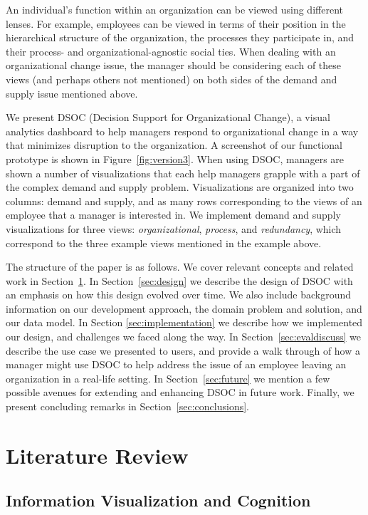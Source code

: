 \documentclass[journal]{vgtc}                %
\begin{document}
An individual's function within an organization can be viewed using different lenses. For example, employees can be viewed in terms of their position in the hierarchical structure of the organization, the processes they participate in, and their process- and organizational-agnostic social ties. When dealing with an organizational change issue, the manager should be considering each of these views (and perhaps others not mentioned) on both sides of the demand and supply issue mentioned above.

We present DSOC (Decision Support for Organizational Change), a visual analytics dashboard to help managers respond to organizational change in a way that minimizes disruption to the organization. A screenshot of our functional prototype is shown in Figure~\ref{fig:version3}. When using DSOC, managers are shown a number of visualizations that each help managers grapple with a part of the complex demand and supply problem. Visualizations are organized into two columns: demand and supply, and as many rows corresponding to the views of an employee that a manager is interested in. We implement demand and supply visualizations for three views: \emph{organizational}, \emph{process}, and \emph{redundancy}, which correspond to the three example views mentioned in the example above. 

The structure of the paper is as follows. We cover relevant concepts and related work in Section~\ref{sec:litreview}. In Section~\ref{sec:design} we describe the design of DSOC with an emphasis on how this design evolved over time. We also include background information on our development approach, the domain problem and solution, and our data model. In Section \ref{sec:implementation} we describe how we implemented our design, and challenges we faced along the way. In Section~\ref{sec:evaldiscuss} we describe the use case we presented to users, and provide a walk through of how a manager might use DSOC to help address the issue of an employee leaving an organization in a real-life setting. In Section~\ref{sec:future} we mention a few possible avenues for extending and enhancing DSOC in future work. Finally, we present concluding remarks in Section~\ref{sec:conclusions}.

\section{Literature Review}
\label{sec:litreview}

\subsection{Information Visualization and Cognition}
\end{document}
